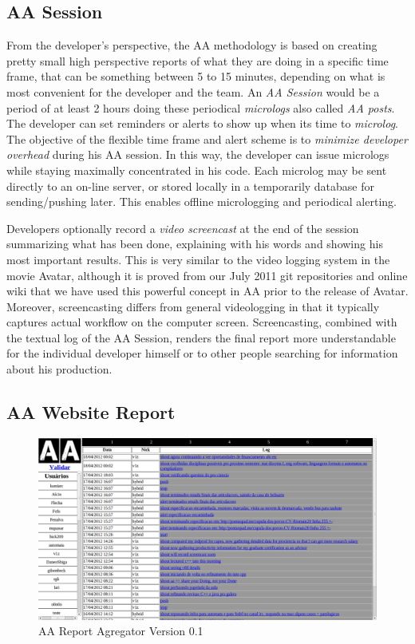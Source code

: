 \documentclass{article}
\begin{document}
\subsection{AA Session}

From the developer's perspective, the AA methodology is based on
creating pretty small high perspective reports of what they are doing
in a specific time frame, that can be something between 5 to 15
minutes, depending on what is most convenient for the developer and the team. An
\emph{AA Session} would be a period of at least 2 hours doing these periodical
\emph{micrologs} also called \emph{AA posts}. The developer can set reminders or alerts to show up when its time to
\emph{microlog}. The objective of the flexible time frame and
alert scheme is to \emph{minimize developer overhead} during his AA session. In
this way, the developer can issue micrologs while staying maximally concentrated in his
code. Each microlog may be sent directly to an on-line server, or stored
locally in a temporarily database for sending/pushing later. This enables
offline micrologging and periodical alerting.

Developers optionally record a \emph{video screencast} at the end of the
session summarizing what has been done, explaining with his words and
showing his most important results. This is very similar to the video logging system
in the movie Avatar, although it is proved from our July 2011 git repositories and online
wiki that we have used this powerful concept in AA prior to the release of
Avatar. Moreover, screencasting differs from general videologging in that it
typically captures actual workflow on
the computer screen. Screencasting, combined with the textual log of the AA
Session, renders the final report more understandable for the individual developer himself
or to other people searching for information about his production.

\subsection{AA Website Report}

\begin{figure}
\begin{center}
   \includegraphics[width=\linewidth]{figs/aa-0_1.png}
\end{center}
   \caption{AA Report Agregator Version 0.1}
\label{fig:aaserver}
\end{figure}
\end{document}
